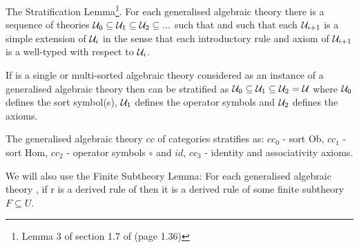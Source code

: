 \note The Stratification Lemma\footnote{Lemma 3 of section 1.7 of \cite{Cartmell78} (page 1.36)}. For each generalised algebraic theory \gatUw  there is a sequence of theories 
$\mathcal{U}_0 \subseteq \mathcal{U}_1 \subseteq \mathcal{U}_2 \subseteq ...$ such that  
and such that each $\mathcal{U}_{i+1}$ is a simple extension of $\mathcal{U}_i$ in the sense that each introductory rule and axiom of $\mathcal{U}_{i+1}$ is a well-typed  with respect to $\mathcal{U}_i$.

\note
If \gatUw is a single or multi-sorted algebraic theory considered as an instance of a
 generalised algebraic theory then \gatUw can be stratified as $\mathcal{U}_0 \subseteq \mathcal{U}_1 \subseteq \mathcal{U}_2=\mathcal{U}$
where $\mathcal{U}_0$ defines the sort symbol(s), $\mathcal{U}_1$ defines the operator symbols and $\mathcal{U}_2$ defines the axioms. 

\note The generalised algebraic theory $cc$ of categories stratifies as: $cc_0$ - sort Ob,
$cc_1$ - sort Hom, $cc_2$ - operator symbols $\circ$ and $id$, $cc_3$ - identity and associativity axioms.
 

\note We will also use the Finite Subtheory Lemma: For each generalised algebraic theory \gatU, if r is a derived rule of \gatUw then it is a derived rule of some finite subtheory $F \subseteq U$. 





